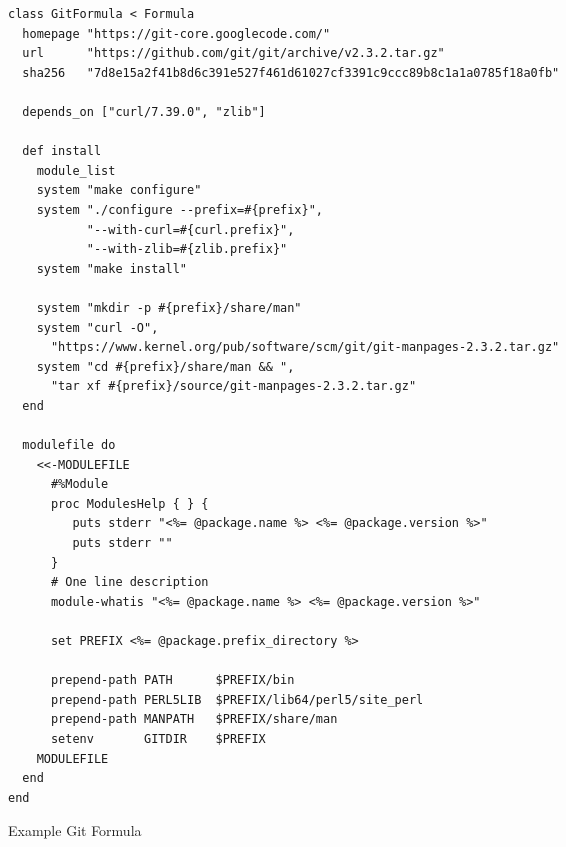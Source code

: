 \documentclass{acm_proc_article-sp}
\begin{document}

\appendix

\begin{figure*} %
\begin{verbatim}
class GitFormula < Formula
  homepage "https://git-core.googlecode.com/"
  url      "https://github.com/git/git/archive/v2.3.2.tar.gz"
  sha256   "7d8e15a2f41b8d6c391e527f461d61027cf3391c9ccc89b8c1a1a0785f18a0fb"

  depends_on ["curl/7.39.0", "zlib"]

  def install
    module_list
    system "make configure"
    system "./configure --prefix=#{prefix}",
           "--with-curl=#{curl.prefix}",
           "--with-zlib=#{zlib.prefix}"
    system "make install"

    system "mkdir -p #{prefix}/share/man"
    system "curl -O",
      "https://www.kernel.org/pub/software/scm/git/git-manpages-2.3.2.tar.gz"
    system "cd #{prefix}/share/man && ",
      "tar xf #{prefix}/source/git-manpages-2.3.2.tar.gz"
  end

  modulefile do
    <<-MODULEFILE
      #%Module
      proc ModulesHelp { } {
         puts stderr "<%= @package.name %> <%= @package.version %>"
         puts stderr ""
      }
      # One line description
      module-whatis "<%= @package.name %> <%= @package.version %>"

      set PREFIX <%= @package.prefix_directory %>

      prepend-path PATH      $PREFIX/bin
      prepend-path PERL5LIB  $PREFIX/lib64/perl5/site_perl
      prepend-path MANPATH   $PREFIX/share/man
      setenv       GITDIR    $PREFIX
    MODULEFILE
  end
end
\end{verbatim}
\caption{Example Git Formula}
\label{fig:GitFormula}
\end{figure*}
\end{document}
